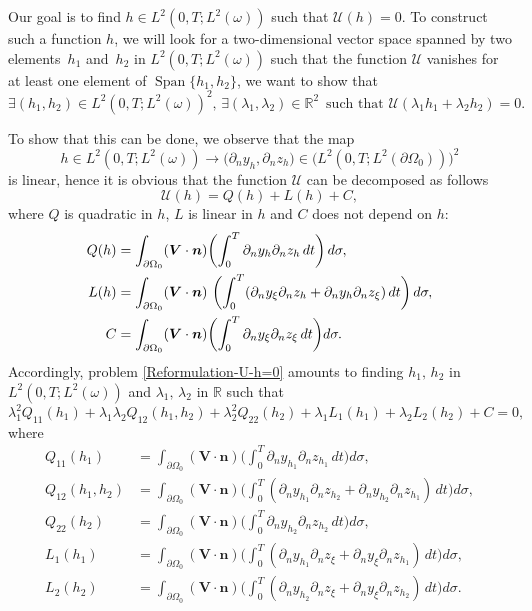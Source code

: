\documentclass[JEP,XML,SOM,Unicode,NoFloatCountersInSection]{cedram}
\newcommand{\bn}{\boldsymbol{n}}
\newcommand{\bV}{\boldsymbol{V}}
\DeclareMathOperator{\Span}{Span}
\newcommand\R{{\mathbb R}}
\theoremstyle{definition}
\begin{document}
Our goal is to find $h \in L^2(0,T; L^2(\omega))$ such that $\mathcal{U}(h)= 0$. To construct such a function $h$, we will look for a two-dimensional vector space spanned by two elements~$h_1$ and~$h_2$ in $L^2(0,T; L^2(\omega))$ such that the function $\mathcal{U}$ vanishes for at least one element of $\Span \{ h_1, h_2\}$, \ie we want to show that
\begin{equation}
\label{Reformulation-U-h=0}
\exists (h_1,h_2)\in L^2(0,T; L^2(\omega))^2,\,\exists (\lambda_1, \lambda_2) \in \R^2 \, \text{ such that } \mathcal{U}(\lambda_1 h_1 + \lambda_2 h_2) = 0.
\end{equation}

To show that this can be done, we observe that the map
\[
h \in L^2(0,T; L^2(\omega)) \to \bigl(\partial_n y_h, \partial_n z_h)\in (L^2(0,T; L^2(\partial\Omega_0))\bigr)^2
\]
is linear, hence it is obvious that the function $\mathcal{U}$ can be decomposed as follows
\begin{equation*}
\mathcal{U}(h)=Q(h)+L(h)+C,
\end{equation*}
where $Q$ is quadratic in $h$, $L$ is linear in $h$ and $C$ does not depend on $h$:
\begin{align}
Q(h)&= \int_{\partial \Omega_0} (\bV\cdot \bn)
\biggl(\int_0^T \partial_{n} y_{h}\partial_{n} z_{h}\, dt\biggr)\, d\sigma,
\label{quadra}
\\
L(h)&= \int_{\partial \Omega_0}(\bV\cdot \bn) \
\biggl(\int_0^T (\partial_{n} y_{\xi}\partial_{n} z_{h}+\partial_{n} y_{h}\partial_{n} z_{\xi})\, dt \biggr)\,d\sigma,
\notag
\\
C&= \int_{\partial \Omega_0} (\bV\cdot \bn)
\biggl(\int_0^T \partial_{n} y_{\xi}\partial_{n} z_{\xi}\, dt \biggr)
d\sigma.
\notag
\end{align}
Accordingly, problem \eqref{Reformulation-U-h=0} amounts to finding $h_1,\,h_2$ in $L^2(0,T; L^2(\omega))$ and $\lambda_1,\,\lambda_2$ in $\R$ such that
\begin{equation}
\label{eqM1}
\lambda_1^2Q_{11}(h_1)+\lambda_1\lambda_2 Q_{12}(h_1,h_2)+\lambda_2^2Q_{22}(h_2)
+\lambda_1 L_{1}(h_1)+\lambda_2 L_2(h_2)+C=0,
\end{equation}
where
\begin{align*}
Q_{11}(h_1)&= \int_{\partial \Omega_0} (\bV \cdot \bn)
\biggl(\int_0^T \partial_{n} y_{h_1}\partial_{n} z_{h_1}\, dt\biggr) d\sigma,
\\
Q_{12}(h_1,h_2)&= \int_{\partial \Omega_0}(\bV\cdot \bn) \biggl(\int_0^T (\partial_{n} y_{h_1}\partial_{n} z_{h_2}+\partial_{n} y_{h_2}\partial_{n} z_{h_1})\, dt\biggr) d\sigma,
\\
Q_{22}(h_2) &= \int_{\partial \Omega_0} (\bV \cdot \bn)\biggl(\int_0^T \partial_{n} y_{h_2}\partial_{n} z_{h_2}\, dt\biggr) d\sigma,
\\
L_1(h_1) &= \int_{\partial \Omega_0} (\bV \cdot \bn)\biggl(\int_0^T (\partial_{n} y_{h_1}\partial_{n} z_{\xi}+\partial_{n} y_{\xi}\partial_{n} z_{h_1})\, dt\biggr) d\sigma,
\\
L_2(h_2) &= \int_{\partial\Omega_0} (\bV \cdot \bn)\biggl(\int_0^T(\partial_{n} y_{h_2}\partial_{n} z_{\xi}+\partial_{n} y_{\xi}\partial_{n} z_{h_2})\, dt \biggr)d\sigma.
\end{align*}
\end{document}
